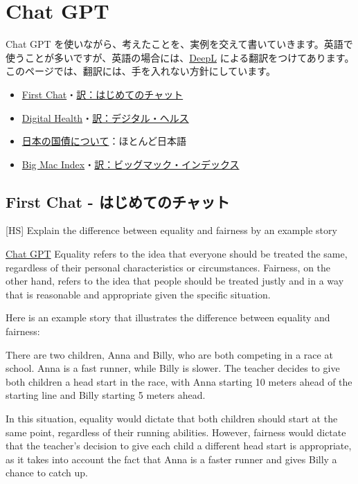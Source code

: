 \documentclass[
]{book}
\providecommand{\tightlist}{%
  \setlength{\itemsep}{0pt}\setlength{\parskip}{0pt}}
\theoremstyle{definition}
\theoremstyle{definition}
\theoremstyle{definition}
\theoremstyle{definition}
\theoremstyle{remark}
\begin{document}
\hypertarget{chatgpt}{%
\chapter{Chat GPT}\label{chatgpt}}

Chat GPT を使いながら、考えたことを、実例を交えて書いていきます。英語で使うことが多いですが、英語の場合には、\href{https://www.deepl.com/translator}{DeepL} による翻訳をつけてあります。このページでは、翻訳には、手を入れない方針にしています。

\begin{itemize}
\tightlist
\item
  \protect\hyperlink{firstchat}{First Chat}・\protect\hyperlink{firstchatj}{訳：はじめてのチャット}
\item
  \protect\hyperlink{digitalhealth}{Digital Health}・\protect\hyperlink{digitalhealthj}{訳：デジタル・ヘルス}
\item
  \protect\hyperlink{nationalbond}{日本の国債について}：ほとんど日本語
\item
  \protect\hyperlink{bigmacindex}{Big Mac Index}・\protect\hyperlink{bigmacindexj}{訳：ビッグマック・インデックス}
\end{itemize}

\hypertarget{firstchat}{%
\section{First Chat - はじめてのチャット　}\label{firstchat}}

{[}HS{]} Explain the difference between equality and fairness by an example story

\protect\hyperlink{chatgpt}{Chat GPT} Equality refers to the idea that everyone should be treated the same, regardless of their personal characteristics or circumstances. Fairness, on the other hand, refers to the idea that people should be treated justly and in a way that is reasonable and appropriate given the specific situation.

Here is an example story that illustrates the difference between equality and fairness:

There are two children, Anna and Billy, who are both competing in a race at school. Anna is a fast runner, while Billy is slower. The teacher decides to give both children a head start in the race, with Anna starting 10 meters ahead of the starting line and Billy starting 5 meters ahead.

In this situation, equality would dictate that both children should start at the same point, regardless of their running abilities. However, fairness would dictate that the teacher's decision to give each child a different head start is appropriate, as it takes into account the fact that Anna is a faster runner and gives Billy a chance to catch up.
\end{document}
